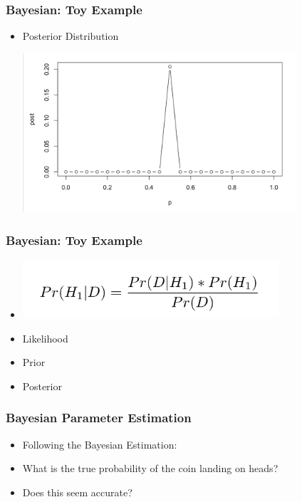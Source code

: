 \documentclass[14pt,handout]{beamer}
\begin{document}
\begin{frame}
\frametitle{Bayesian: Toy Example}
\begin{itemize}
	\item<+-> Posterior Distribution
	\begin{center}
	\includegraphics[width=0.8\textwidth]{images_20171130_posterior.png}
	\end{center}
\end{itemize}
\end{frame}

\begin{frame}
\frametitle{Bayesian: Toy Example}
\begin{itemize}
\item[] 
	\begin{center}
	\includegraphics[width=0.75\textwidth]{images_20171130_bayes_final.png}
	\end{center}
	\item<+-> Likelihood
	\item<+-> Prior
	\item<+-> Posterior
\end{itemize}
\end{frame}

\begin{frame}
\frametitle{Bayesian Parameter Estimation}
\begin{itemize}
	\item<+-> Following the Bayesian Estimation:
	\item<+-> What is the true probability of the coin landing on heads?
	\item<+-> Does this seem accurate?
\end{itemize}
\end{frame}
\end{document}
